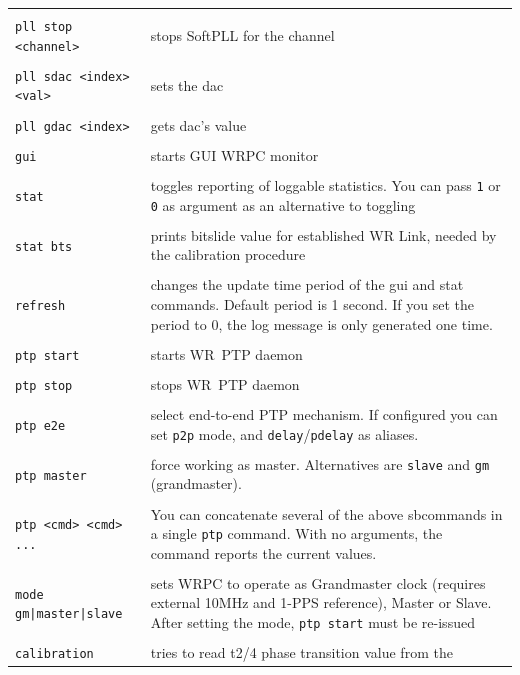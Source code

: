 \documentclass[a4paper, 12pt]{article}
\newcommand{\code}[1]{\texttt{#1}}
\newcommand{\codeHook}[1]{\mbox{\ttfamily\MakeTextUppercase{#1}}}
\begin{document}
\begin{longtable}{  p{8cm}  p{6cm} }
 & \\
  \code{pll stop <channel>} & stops SoftPLL for the channel\\
 & \\
  \code{pll sdac <index> <val>} & sets the dac\\
 & \\
  \code{pll gdac <index>} & gets dac's value\\
 & \\
  \code{gui} & starts GUI \codeHook{wrpc} monitor\\
 & \\
  \code{stat} & toggles reporting of loggable statistics. You can pass
\texttt{1} or \texttt{0} as argument as an alternative to toggling\\
 & \\
  \code{stat bts} & prints bitslide value for established \codeHook{wr} Link,
needed by the calibration procedure\\
 & \\
  \code{refresh} & changes the update time period of the gui and stat
commands. Default period is 1 second. If you set the period to 0, the log
message is only generated one time.\\
 & \\
  \code{ptp start} & starts \codeHook{wr ptp} daemon\\
 & \\
  \code{ptp stop} & stops \codeHook{wr ptp} daemon\\
 & \\
  \code{ptp e2e} & select end-to-end PTP mechanism. If configured you can set \texttt{p2p} mode, and \texttt{delay}/\texttt{pdelay} as aliases.\\
 & \\
  \code{ptp master} & force working as master. Alternatives are \texttt{slave} and \texttt{gm} (grandmaster).\\
 & \\
  \code{ptp <cmd> <cmd> ...} & You can concatenate several of the above sbcommands in a single \texttt{ptp} command. With no arguments, the command reports the current values.\\
 & \\
  \code{mode gm|master|slave} & sets \codeHook{wrpc} to operate as Grandmaster
clock (requires external 10MHz and 1-PPS reference), Master or Slave. After
setting the mode, \texttt{ptp start} must be re-issued\\
 & \\
  \code{calibration} & tries to read t2/4 phase transition value from the

\end{longtable}
\end{document}
